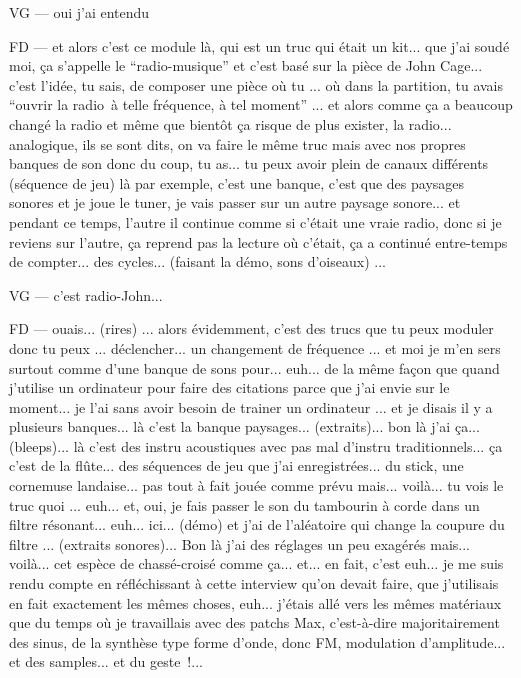 VG — oui j'ai entendu 

FD — et alors c'est ce module là, qui est un truc qui était un kit... que j'ai soudé moi, ça s'appelle le ``radio-musique'' et c'est basé sur la pièce de John Cage... c'est l'idée, tu sais, de composer une pièce où tu ... où dans la partition, tu avais ``ouvrir la radio à telle fréquence, à tel moment'' ... et alors comme ça a beaucoup changé la radio et même que bientôt ça risque de plus exister, la radio... analogique, ils se sont dits, on va faire le même  truc mais avec nos propres banques de son donc du coup, tu as... tu peux avoir plein de canaux différents (séquence de jeu) là par exemple, c'est une banque, c'est que des paysages sonores et je joue le tuner, je vais passer sur un autre paysage sonore... et pendant ce temps, l'autre il continue comme si c'était une vraie radio, donc si je reviens sur  l'autre, ça reprend pas la lecture où c'était, ça a continué entre-temps de compter... des cycles... (faisant la démo, sons d'oiseaux) ... 

VG — c'est radio-John... 

FD — ouais... (rires) ... alors évidemment, c'est des trucs que tu peux moduler donc tu peux ... déclencher... un changement de fréquence ... et moi je m'en sers surtout comme d'une banque de sons pour... euh... de la même façon que quand j'utilise un ordinateur pour faire des citations parce que j'ai envie sur le moment... je l'ai sans avoir besoin de trainer un ordinateur ... et je disais il y a plusieurs banques... là c'est la banque paysages... (extraits)... bon là j'ai ça... (bleeps)... là c'est des instru acoustiques avec pas mal d'instru traditionnels... ça c'est de la flûte... des séquences de jeu que j'ai enregistrées... du stick, une cornemuse landaise... pas tout à fait jouée comme prévu mais... voilà... tu vois le truc quoi ... euh... et, oui, je fais passer le son du tambourin à corde dans un filtre résonant... euh... ici... (démo) et j'ai de l'aléatoire qui change la coupure du filtre ... (extraits sonores)... Bon là j'ai des réglages un peu exagérés mais... voilà... cet espèce de chassé-croisé comme ça... et... en fait, c'est euh... je me suis rendu compte en réfléchissant à cette interview qu'on devait faire, que j'utilisais en fait exactement les mêmes choses, euh... j'étais allé vers les mêmes matériaux que du temps où je travaillais avec des patchs Max, c'est-à-dire majoritairement des sinus, de la synthèse type forme d'onde, donc FM, modulation d'amplitude... et des samples... et du geste !... 

